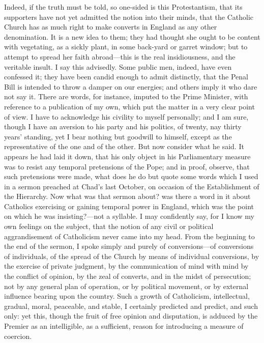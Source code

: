 Indeed, if the truth must be told, so one-sided is
this Protestantism, that its supporters have not yet
admitted the notion into their minds, that the Catholic
Church has as much right to make converts in England as
any other denomination. It is a new idea to them; they
had thought she ought to be content with vegetating, as a
sickly plant, in some back-yard or garret window; but to
attempt to spread her faith abroad—this is the real
insidiousness, and the veritable insult. I say this
advisedly. Some public men, indeed, have even confessed
it; they have been candid enough to admit distinctly,
that the Penal Bill is intended to throw a damper on our
energies; and others imply it who dare not say it. There
are words, for instance, imputed to the Prime Minister,
with reference to a publication of my own, which put the
matter in a very clear point of view. I have to
acknowledge his civility to myself personally; and I am
sure, though I have an aversion to his party and his
politics, of twenty, nay thirty years' standing, yet I
bear nothing but goodwill to himself, except as the
representative of the one and of the other. But now
consider what he said. It appears he had laid it down,
that his only object in his Parliamentary measure was to
resist any temporal pretensions of the Pope; and in
proof, observe, that such pretensions were made, what
does he do but quote some words which I used in a sermon
preached at Chad's last October, on occasion of the
Establishment of the Hierarchy. Now what was that sermon
about? was there a word in it about Catholics exercising
or gaining temporal power in England, which was the point
on which he was insisting?—not a syllable. I may
confidently say, for I know my own feelings on the
subject, that the notion of any civil or political
aggrandisement of Catholicism never came into my head.
From the beginning to the end of the sermon, I spoke
simply and purely of conversions—of conversions of
individuals, of the spread of the Church by means of
individual conversions, by the exercise of private
judgment, by the communication of mind with mind by the
conflict of opinion, by the zeal of converts, and in the
midst of persecution; not by any general plan of
operation, or by political movement, or by external
influence bearing upon the country. Such a growth of
Catholicism, intellectual, gradual, moral, peaceable, and
stable, I certainly predicted and predict, and such only:
yet this, though the fruit of free opinion and
disputation, is adduced by the Premier as an
intelligible, as a sufficient, reason for introducing a
measure of coercion.

